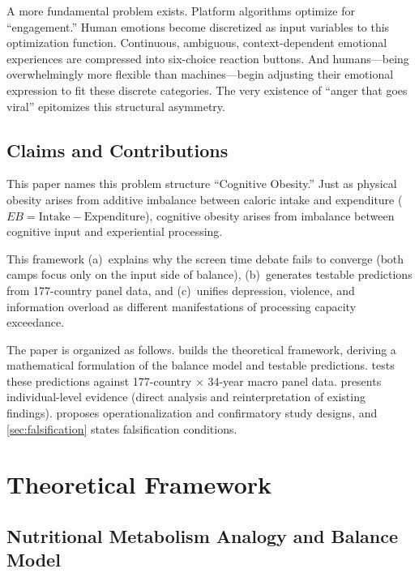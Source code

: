 \documentclass[a4paper,11pt,titlepage]{article}
\begin{document}
A more fundamental problem exists. Platform algorithms optimize for ``engagement.'' Human emotions become discretized as input variables to this optimization function. Continuous, ambiguous, context-dependent emotional experiences are compressed into six-choice reaction buttons. And humans---being overwhelmingly more flexible than machines---begin adjusting their emotional expression to fit these discrete categories. The very existence of ``anger that goes viral'' epitomizes this structural asymmetry.

\subsection{Claims and Contributions}

This paper names this problem structure ``Cognitive Obesity.'' Just as physical obesity arises from additive imbalance between caloric intake and expenditure ($EB = \text{Intake} - \text{Expenditure}$), cognitive obesity arises from imbalance between cognitive input and experiential processing.

This framework
(a)~explains why the screen time debate fails to converge (both camps focus only on the input side of balance),
(b)~generates testable predictions from 177-country panel data, and
(c)~unifies depression, violence, and information overload as different manifestations of processing capacity exceedance.

The paper is organized as follows.  builds the theoretical framework, deriving a mathematical formulation of the balance model and testable predictions.  tests these predictions against 177-country $\times$ 34-year macro panel data.  presents individual-level evidence (direct analysis and reinterpretation of existing findings).  proposes operationalization and confirmatory study designs, and \cref{sec:falsification} states falsification conditions.


\section{Theoretical Framework}\label{sec:theory}

\subsection{Nutritional Metabolism Analogy and Balance Model}\label{sec:analogy}
\end{document}
